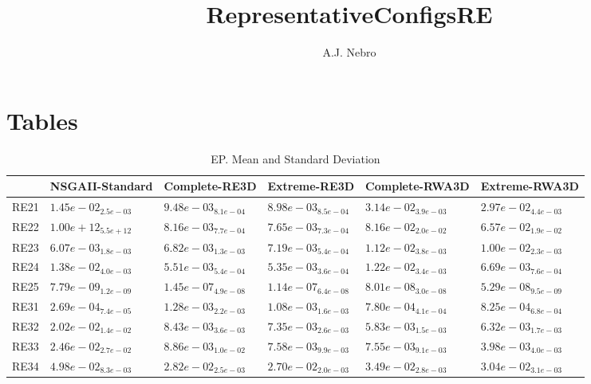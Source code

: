 \documentclass{article}
\title{RepresentativeConfigsRE}
\author{A.J. Nebro}
\begin{document}
\maketitle
\section{Tables}

\begin{table}
\caption{EP. Mean and Standard Deviation}
\label{table: EP}
\centering
\begin{scriptsize}
\begin{tabular}{llllll}
\hline & NSGAII-Standard & Complete-RE3D & Extreme-RE3D & Complete-RWA3D &  Extreme-RWA3D\\
\hline 
RE21 & $  1.45e-02_{ 2.5e-03}$ & \cellcolor{gray25}$  9.48e-03_{ 8.1e-04}$ & \cellcolor{gray95}$  8.98e-03_{ 8.5e-04}$ & $  3.14e-02_{ 3.9e-03}$ & $  2.97e-02_{ 4.4e-03}$ \\
RE22 & $  1.00e+12_{ 5.5e+12}$ & \cellcolor{gray25}$  8.16e-03_{ 7.7e-04}$ & \cellcolor{gray95}$  7.65e-03_{ 7.3e-04}$ & $  8.16e-02_{ 2.0e-02}$ & $  6.57e-02_{ 1.9e-02}$ \\
RE23 & \cellcolor{gray95}$  6.07e-03_{ 1.8e-03}$ & \cellcolor{gray25}$  6.82e-03_{ 1.3e-03}$ & $  7.19e-03_{ 5.4e-04}$ & $  1.12e-02_{ 3.8e-03}$ & $  1.00e-02_{ 2.3e-03}$ \\
RE24 & $  1.38e-02_{ 4.0e-03}$ & \cellcolor{gray25}$  5.51e-03_{ 5.4e-04}$ & \cellcolor{gray95}$  5.35e-03_{ 3.6e-04}$ & $  1.22e-02_{ 3.4e-03}$ & $  6.69e-03_{ 7.6e-04}$ \\
RE25 & \cellcolor{gray95}$  7.79e-09_{ 1.2e-09}$ & $  1.45e-07_{ 4.9e-08}$ & $  1.14e-07_{ 6.4e-08}$ & $  8.01e-08_{ 3.0e-08}$ & \cellcolor{gray25}$  5.29e-08_{ 9.5e-09}$ \\
RE31 & \cellcolor{gray95}$  2.69e-04_{ 7.4e-05}$ & $  1.28e-03_{ 2.2e-03}$ & $  1.08e-03_{ 1.6e-03}$ & \cellcolor{gray25}$  7.80e-04_{ 4.1e-04}$ & $  8.25e-04_{ 6.8e-04}$ \\
RE32 & $  2.02e-02_{ 1.4e-02}$ & $  8.43e-03_{ 3.6e-03}$ & $  7.35e-03_{ 2.6e-03}$ & \cellcolor{gray95}$  5.83e-03_{ 1.5e-03}$ & \cellcolor{gray25}$  6.32e-03_{ 1.7e-03}$ \\
RE33 & $  2.46e-02_{ 2.7e-02}$ & $  8.86e-03_{ 1.0e-02}$ & $  7.58e-03_{ 9.9e-03}$ & \cellcolor{gray25}$  7.55e-03_{ 9.1e-03}$ & \cellcolor{gray95}$  3.98e-03_{ 4.0e-03}$ \\
RE34 & $  4.98e-02_{ 8.3e-03}$ & \cellcolor{gray25}$  2.82e-02_{ 2.5e-03}$ & \cellcolor{gray95}$  2.70e-02_{ 2.0e-03}$ & $  3.49e-02_{ 2.8e-03}$ & $  3.04e-02_{ 3.1e-03}$ \\

\end{tabular}
\end{scriptsize}
\end{table}
\end{document}
